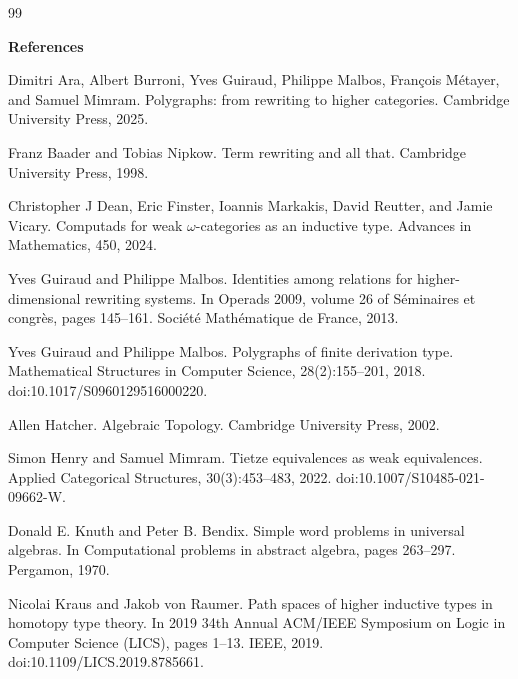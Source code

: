 \documentclass[10pt,a4paper]{amsart}
\begin{document}
\begin{thebibliography}{99}

 
\par\medskip\noindent\textbf{References}\par
  
\par\noindent  [1]  Dimitri Ara, Albert Burroni, Yves Guiraud, Philippe Malbos, François Métayer, and Samuel Mimram.  Polygraphs: from rewriting to higher categories.  Cambridge University Press, 2025.  
 
\par\noindent  [2]  Franz Baader and Tobias Nipkow.  Term rewriting and all that.  Cambridge University Press, 1998.  
 
\par\noindent  [3]  Christopher J Dean, Eric Finster, Ioannis Markakis, David Reutter, and Jamie Vicary.  Computads for weak $\omega$-categories as an inductive type.  Advances in Mathematics, 450, 2024.  
 
\par\noindent  [4]  Yves Guiraud and Philippe Malbos.  Identities among relations for higher-dimensional rewriting systems.  In Operads 2009, volume 26 of Séminaires et congrès, pages 145–161. Société Mathématique de France, 2013.  
 
\par\noindent  [5]  Yves Guiraud and Philippe Malbos.  Polygraphs of finite derivation type.  Mathematical Structures in Computer Science, 28(2):155–201, 2018.  doi:10.1017/S0960129516000220.  
 
\par\noindent  [6]  Allen Hatcher.  Algebraic Topology.  Cambridge University Press, 2002.  
 
\par\noindent  [7]  Simon Henry and Samuel Mimram.  Tietze equivalences as weak equivalences.  Applied Categorical Structures, 30(3):453–483, 2022.  doi:10.1007/S10485-021-09662-W.  
 
\par\noindent  [8]  Donald E. Knuth and Peter B. Bendix.  Simple word problems in universal algebras.  In Computational problems in abstract algebra, pages 263–297. Pergamon, 1970.  
 
\par\noindent  [9]  Nicolai Kraus and Jakob von Raumer.  Path spaces of higher inductive types in homotopy type theory.  In 2019 34th Annual ACM/IEEE Symposium on Logic in Computer Science (LICS), pages 1–13. IEEE, 2019.  doi:10.1109/LICS.2019.8785661.  
 

\end{thebibliography}
\end{document}
